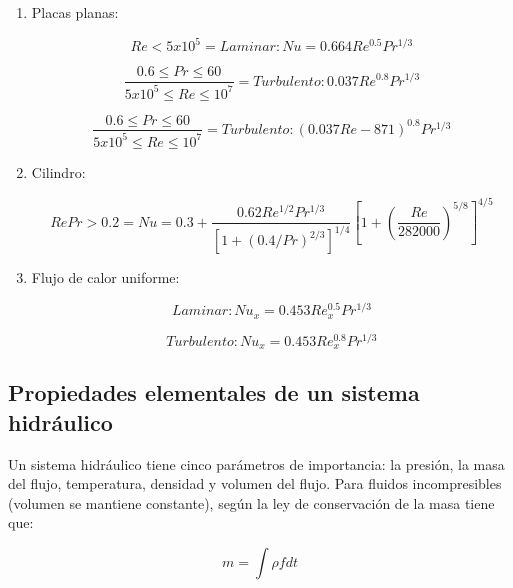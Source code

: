 \documentclass[12pt,letterpaper]{article}     %
\begin{document}
\begin{enumerate}
    \item Placas planas: 
    
\begin{equation}
 Re < 5x10^{5} = Laminar: Nu = 0.664Re^{0.5}Pr^{1/3}
    \label{eq:p.planaslaminar}
\end{equation}

\begin{equation}
 \frac{0.6 \leq Pr \leq 60}{5x10^{5} \leq Re \leq 10^{7}} = Turbulento: 0.037Re^{0.8}Pr^{1/3}
 \label{eq:p.planasturbulento}
\end{equation}

\begin{equation}
\frac{0.6 \leq Pr \leq 60}{5x10^{5} \leq Re \leq 10^{7}} = Turbulento: (0.037Re - 871)^{0.8}Pr^{1/3}
    \label{eq:p.planascombinado}
\end{equation}

\item Cilindro:

\begin{equation}
Re Pr > 0.2 = Nu = 0.3 + \frac{0.62Re^{1/2}Pr^{1/3}}{[1 + (0.4/Pr)^{2/3}]^{1/4}}[1 + (\frac{Re}{282000})^{5/8}]^{4/5}
    \label{eq:p.cilindro}
\end{equation}

\item Flujo de calor uniforme:

\begin{equation}
Laminar: Nu_{x} = 0.453Re_{x}^{0.5}Pr^{1/3}
    \label{eq:p.flujoconst.laminar}
\end{equation}

\begin{equation}
Turbulento: Nu_{x} = 0.453Re_{x}^{0.8}Pr^{1/3}
    \label{eq:p.flujoconst.turbulento}
\end{equation}
\end{enumerate}

\subsection{Propiedades elementales de un sistema hidráulico}

Un sistema  hidráulico tiene cinco parámetros de importancia: la presión, la masa del flujo, temperatura, densidad y volumen del flujo.
Para fluidos incompresibles (volumen se mantiene constante), según la ley de conservación de la masa tiene que:

\begin{equation}
m=\int \rho fdt     
\label{eq:flujo}
\end{equation}
\end{document}
